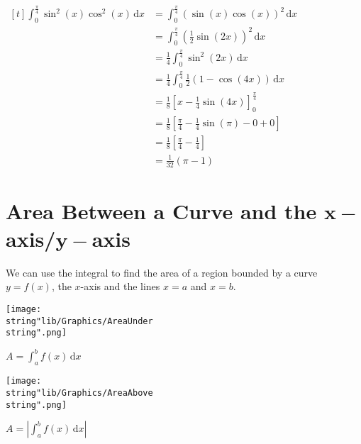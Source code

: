 \documentclass[11pt,a4paper]{book}
\begin{document}
\begin{example}
\begin{tasks}[label=(\alph*),label-width=3.5ex]
\task$
\begin{aligned}[t]
{\displaystyle \int_{0}^{\frac{\pi}{4}}\sin^{2}(x)\cos^{2}(x)\,\mathrm{d}x} & ={\displaystyle \int_{0}^{\frac{\pi}{4}}}\left(\sin(x)\cos(x)\right)^{2}\,\mathrm{d}x\\
 & ={\displaystyle \int_{0}^{\frac{\pi}{4}}}\left(\frac{1}{2}\sin(2x)\right)^{2}\,\mathrm{d}x\\
 & =\frac{1}{4}{\displaystyle \int_{0}^{\frac{\pi}{4}}}\sin^{2}(2x)\,\mathrm{d}x\\
 & =\frac{1}{4}{\displaystyle \int_{0}^{\frac{\pi}{4}}\frac{1}{2}\left(1-\cos(4x)\right)}\,\mathrm{d}x\\
 & =\frac{1}{8}\left[x-\frac{1}{4}\sin(4x)\right]_{0}^{\frac{\pi}{4}}\\
 & =\frac{1}{8}\left[\frac{\pi}{4}-\frac{1}{4}\sin(\pi)-0+0\right]\\
 & =\frac{1}{8}\left[\frac{\pi}{4}-\frac{1}{4}\right]\\
 & =\frac{1}{32}(\pi-1)
\end{aligned}
$

\end{tasks}

\end{example}

\newpage{}

\section{Area Between a Curve and the $\boldsymbol{x-}$axis/$\boldsymbol{y-}$axis}

We can use the integral to find the area of a region bounded by a
curve $y=f(x)$, the $x$-axis and the lines $x=a$ and $x=b$.

\begin{minipage}[t]{.5\textwidth}
\begin{center}
\texttt{[image: \\string"lib/Graphics/AreaUnder\\string".png]}
\par\end{center}

\begin{center}
${\displaystyle A=\int_{a}^{b}f(x)\,\mathrm{d}x}$
\par\end{center}

\end{minipage}
\begin{minipage}[t]{.5\textwidth}
\begin{center}
\texttt{[image: \\string"lib/Graphics/AreaAbove\\string".png]}
\par\end{center}

\begin{center}
${\displaystyle A=\left|\int_{a}^{b}f(x)\,\mathrm{d}x\right|}$
\par\end{center}

\end{minipage}
\end{document}
